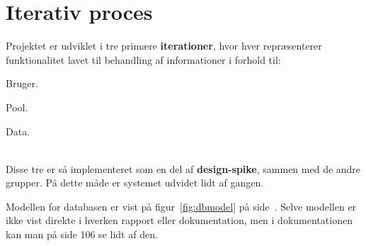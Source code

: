 \section{Iterativ proces}


Projektet er udviklet i tre primære \textbf{iterationer}, hvor hver repræsenterer funktionalitet lavet til behandling af informationer i forhold til:
\\

\begin{enumerate*}
	\item Bruger.
	\item Pool.
	\item Data.
\end{enumerate*}
\\

Disse tre er så implementeret som en del af \textbf{design-spike}, sammen med de andre grupper. På dette måde er systemet udvidet lidt af gangen. 

Modellen for databasen er vist på figur~\ref{fig:dbmodel} på side~\pageref{fig:dbmodel}. Selve modellen er ikke vist direkte i hverken rapport eller dokumentation, men i dokumentationen kan man på side 106 se lidt af den.

